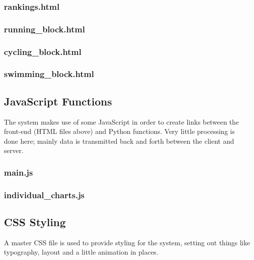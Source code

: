 \documentclass{article}[12pt,a4paper]
\begin{document}
\subsubsection{rankings.html}


\subsubsection{running\_block.html}


\subsubsection{cycling\_block.html}


\subsubsection{swimming\_block.html}



\subsection{JavaScript Functions}
The system makes use of some JavaScript in order to create links between the front-end (HTML files above) and Python functions. Very little processing is done here; mainly data is transmitted back and forth between the client and server.

\subsubsection{main.js}


\subsubsection{individual\_charts.js}



\subsection{CSS Styling}
A master CSS file is used to provide styling for the system, setting out things like typography, layout and a little animation in places.
\end{document}
